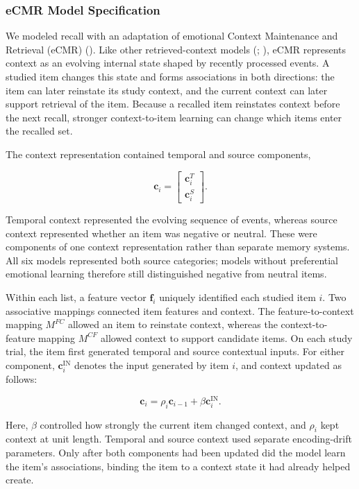 \documentclass[
  man,
  longtable,
  nolmodern,
  notxfonts,
  notimes,
  draftfirst,
  colorlinks=true,linkcolor=blue,citecolor=blue,urlcolor=blue]{apa7}
\begin{document}
\subsubsection{eCMR Model Specification}\label{ecmr-model-specification}

We modeled recall with an adaptation of emotional Context Maintenance
and Retrieval (eCMR) (). Like other retrieved-context models
(;
), eCMR represents
context as an evolving internal state shaped by recently processed
events. A studied item changes this state and forms associations in both
directions: the item can later reinstate its study context, and the
current context can later support retrieval of the item. Because a
recalled item reinstates context before the next recall, stronger
context-to-item learning can change which items enter the recalled set.

The context representation contained temporal and source components,

\[
\mathbf c_i=
\begin{bmatrix}
\mathbf c_i^T\\
\mathbf c_i^S
\end{bmatrix}.
\]

Temporal context represented the evolving sequence of events, whereas
source context represented whether an item was negative or neutral.
These were components of one context representation rather than separate
memory systems. All six models represented both source categories;
models without preferential emotional learning therefore still
distinguished negative from neutral items.

Within each list, a feature vector \(\mathbf f_i\) uniquely identified
each studied item \(i\). Two associative mappings connected item
features and context. The feature-to-context mapping \(M^{FC}\) allowed
an item to reinstate context, whereas the context-to-feature mapping
\(M^{CF}\) allowed context to support candidate items. On each study
trial, the item first generated temporal and source contextual inputs.
For either component, \(\mathbf c_i^{\mathrm{IN}}\) denotes the input
generated by item \(i\), and context updated as follows:

\[
\mathbf c_i
=
\rho_i\mathbf c_{i-1}
+\beta\mathbf c_i^{\mathrm{IN}}.
\]

Here, \(\beta\) controlled how strongly the current item changed
context, and \(\rho_i\) kept context at unit length. Temporal and source
context used separate encoding-drift parameters. Only after both
components had been updated did the model learn the item's associations,
binding the item to a context state it had already helped create.
\end{document}
